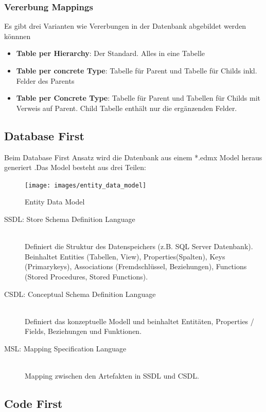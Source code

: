 \subsubsection{Vererbung Mappings}
Es gibt drei Varianten wie Vererbungen in der Datenbank abgebildet werden könnnen
\begin{itemize}
	\item \textbf{Table per Hierarchy}: Der Standard. Alles in eine Tabelle
	\item \textbf{Table per concrete Type}: Tabelle für Parent und Tabelle für Childs inkl. Felder des Parents
	\item \textbf{Table per Concrete Type}: Tabelle für Parent und Tabellen für Childs mit Verweis auf Parent. Child Tabelle enthält nur die ergänzenden Felder.
\end{itemize}

\subsection{Database First}
Beim Database First Ansatz wird die Datenbank aus einem *.edmx Model heraus generiert .Das Model besteht aus drei Teilen:
\begin{figure}[h]
	\centering
	\texttt{[image: images/entity\_data\_model]}
	\caption{Entity Data Model}
	\label{fig:entitydatamodel}
\end{figure}
\begin{description}
	\item[SSDL: Store Schema Definition Language] \hfill \\
	Definiert die Struktur des Datenspeichers (z.B. SQL Server Datenbank). Beinhaltet Entities (Tabellen, View), Properties(Spalten), Keys (Primarykeys), Associations (Fremdschlüssel, Beziehungen), Functions (Stored Procedures, Stored Functions). 
	\item[CSDL: Conceptual Schema Definition Language] \hfill \\
	Definiert das konzeptuelle Modell und beinhaltet Entitäten, Properties / Fields, Beziehungen und Funktionen. 
	\item[MSL: Mapping Specification Language] \hfill \\ 
	Mapping zwischen den Artefakten in SSDL und CSDL.  
\end{description}

\subsection{Code First}

